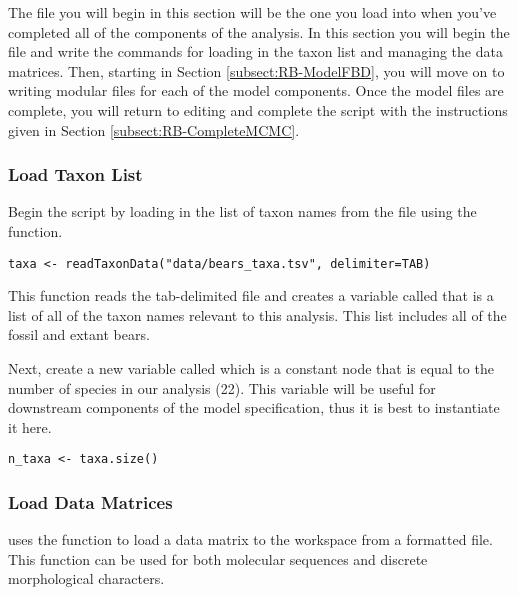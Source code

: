 The file you will begin in this section will be the one you load into \RevBayes when you've completed all of the components of the analysis.
In this section you will begin the file and write the \Rev commands for loading in the taxon list and managing the data matrices.
Then, starting in Section \ref{subsect:RB-ModelFBD}, you will move on to writing modular files for each of the model components. 
Once the model files are complete, you will return to editing  and complete the \Rev script with the instructions given in Section \ref{subsect:RB-CompleteMCMC}.

\medskip
\subsubsection{Load Taxon List}\label{subsub:RB-TaxList}

Begin the \Rev script by loading in the list of taxon names from the  file using the  function.
{\tt \begin{snugshade*}
\begin{lstlisting}
taxa <- readTaxonData("data/bears_taxa.tsv", delimiter=TAB)
\end{lstlisting}
\end{snugshade*}}
This function reads the tab-delimited file and creates a variable called  that is a list of all of the taxon names relevant to this analysis. 
This list includes all of the fossil and extant bears.

Next, create a new variable called  which is a constant node that is equal to the number of species in our analysis (22). 
This variable will be useful for downstream components of the model specification, thus it is best to instantiate it here. 
{\tt \begin{snugshade*}
\begin{lstlisting}
n_taxa <- taxa.size() 
\end{lstlisting}
\end{snugshade*}}


\medskip
\subsubsection{Load Data Matrices}\label{subsub:RB-LoadData}

\RevBayes uses the function  to load a data matrix to the workspace from a formatted file. 
This function can be used for both molecular sequences and discrete morphological characters.


